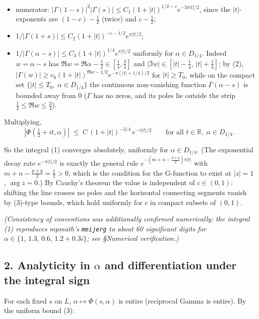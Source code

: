 \documentclass[11pt]{article}
\theoremstyle{remark}
\begin{document}
\begin{itemize}
\item numerator: $|\Gamma(1-s)|^2|\Gamma(s)|\le C_1(1+|t|)^{1/2-c}e^{-3\pi|t|/2}$, since the $|t|$-exponents are $(1-c)-\frac12$ (twice) and $c-\frac12$;
\item $1/|\Gamma(1+s)|\le C_2(1+|t|)^{-c-1/2}e^{\pi|t|/2}$;
\item $1/|\Gamma(\alpha-s)|\le C_3(1+|t|)^{1/4}e^{\pi|t|/2}$ uniformly for $\alpha\in D_{1/4}$. Indeed $w=\alpha-s$ has $\Re w=\Re\alpha-\tfrac12\in[\tfrac14,\tfrac34]$ and $|\Im w|\in[|t|-\tfrac14,\,|t|+\tfrac14]$; by (2), $|\Gamma(w)|\ge c_0(1+|t|)^{\Re w-1/2}e^{-\pi(|t|+1/4)/2}$ for $|t|\ge T_0$, while on the compact set $\{|t|\le T_0,\ \alpha\in D_{1/4}\}$ the continuous non-vanishing function $\Gamma(\alpha-s)$ is bounded away from $0$ ($\Gamma$ has no zeros, and its poles lie outside the strip $\tfrac14\le\Re w\le\tfrac34$).
\end{itemize}

Multiplying,
\begin{equation*}
|\Phi(\tfrac12+it,\alpha)|\;\le\;C\,(1+|t|)^{-3/4}\,e^{-\pi|t|/2}
\qquad\text{for all }t\in\mathbb R,\ \alpha\in D_{1/4}. \tag{3}
\end{equation*}

So the integral (1) converges absolutely, uniformly for $\alpha\in D_{1/4}$. (The exponential decay rate $e^{-\pi|t|/2}$ is exactly the general rule $e^{-(m+n-\frac{p+q}{2})\pi|t|}$ with $m+n-\frac{p+q}{2}=\frac12>0$, which is the condition for the G-function to exist at $|z|=1$, $\arg z=0$.) By Cauchy's theorem the value is independent of $c\in(0,1)$: shifting the line crosses no poles and the horizontal connecting segments vanish by (3)-type bounds, which hold uniformly for $c$ in compact subsets of $(0,1)$.

\emph{(Consistency of conventions was additionally confirmed numerically: the integral (1) reproduces mpmath's \texttt{meijerg} to about 60 significant digits for $\alpha\in\{1,\,1.3,\,0.6,\,1.2+0.3i\}$; see \S Numerical verification.)}

\subsection*{2. Analyticity in $\alpha$ and differentiation under the integral sign}

For each fixed $s$ on $L$, $\alpha\mapsto\Phi(s,\alpha)$ is entire (reciprocal Gamma is entire). By the uniform bound (3):
\end{document}
